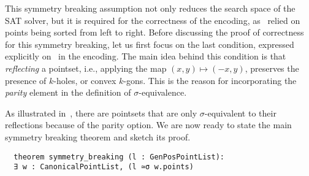 This symmetry breaking assumption not only reduces the search space of the SAT solver, but it is required for the correctness of the encoding, as~ relied on points being sorted from left to right.
Before discussing the proof of correctness for this symmetry breaking, let us first focus on the last condition, expressed explicitly on~ in the encoding. The main idea behind this condition is that \emph{reflecting} a pointset, i.e., applying the map $(x, y) \mapsto (-x, y)$, preserves the presence of $k$-holes, or convex $k$-gons. This is the reason for incorporating the \emph{parity} element in the definition of $\sigma$-equivalence.

As illustrated in~, there are pointsets that are only $\sigma$-equivalent to their reflections because of the parity option. We are now ready to state the main symmetry breaking theorem and sketch its proof.



\begin{lstlisting}
  theorem symmetry_breaking (l : GenPosPointList):
  ∃ w : CanonicalPointList, (l ≃σ w.points)
\end{lstlisting}

